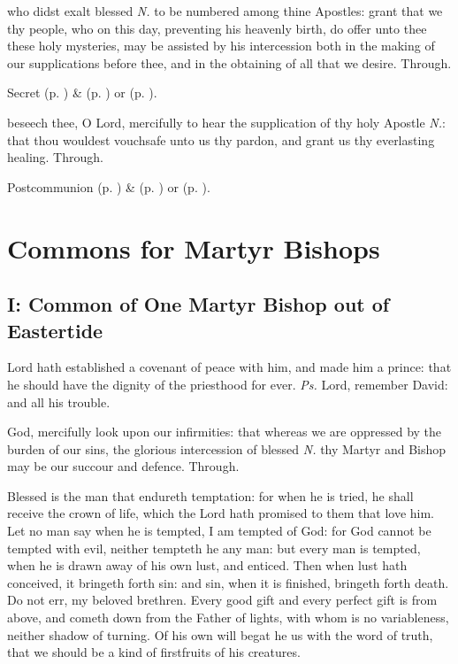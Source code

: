 \secret
{} who didst exalt blessed \textit{N.} to be numbered among thine Apostles: grant that we thy people, who on this day, preventing his heavenly birth, do offer unto thee these holy mysteries, may be assisted by his intercession both in the making of our supplications before thee, and in the obtaining of all that we desire. Through.
\begin{rubric}
	 Secret  (p. \pageref{SPMaryInEaster}) \&   (p. \pageref{SPAgainst}) or  (p. \pageref{SPChiefBishop}).
\end{rubric}
\postcommunion
{} beseech thee, O Lord, mercifully to hear the supplication of thy holy Apostle \textit{N.}: that thou wouldest vouchsafe unto us thy pardon, and grant us thy everlasting healing. Through.
\begin{rubric}
	 Postcommunion  (p. \pageref{SPMaryInEaster}) \&   (p. \pageref{SPAgainst}) or  (p. \pageref{SPChiefBishop}).
\end{rubric}

\section{Commons for Martyr Bishops}

\subsection{I: Common of One Martyr Bishop out of Eastertide}\label{CommonMartyrBishopI}

\introit
{} Lord hath established a covenant of peace with him, and made him a prince: that he should have the dignity of the priesthood for ever. \textit{Ps.} Lord, remember David: and all his trouble.

\collect
{} God, mercifully look upon our infirmities: that whereas we are oppressed by the burden of our sins, the glorious intercession of blessed \textit{N.} thy Martyr and Bishop may be our succour and defence. Through.

 Blessed is the man that endureth temptation: for when he is tried, he shall receive the crown of life, which the Lord hath promised to them that love him. Let no man say when he is tempted, I am tempted of God: for God cannot be tempted with evil, neither tempteth he any man: but every man is tempted, when he is drawn away of his own lust, and enticed. Then when lust hath conceived, it bringeth forth sin: and sin, when it is finished, bringeth forth death. Do not err, my beloved brethren. Every good gift and every perfect gift is from above, and cometh down from the Father of lights, with whom is no variableness, neither shadow of turning. Of his own will begat he us with the word of truth, that we should be a kind of firstfruits of his creatures.

